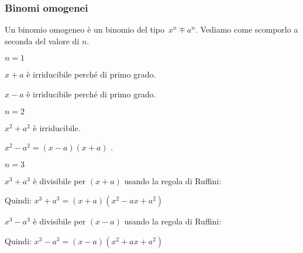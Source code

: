 

\subsubsection{Binomi omogenei}
\label{subsubsec:divpol_binomo}

Un binomio omogeneo è un binomio del tipo~$x^{n} \mp a^{n}$.
Vediamo come scomporlo a seconda del valore di $n$.

\begin{itemize*}
\item $n=1$
 \begin{itemize*}
  \item $x+a$ è irriducibile perché di primo grado.
  \item $x-a$ è irriducibile perché di primo grado.
 \end{itemize*}

 \item $n=2$
 \begin{itemize*}
  \item $x^2+a^2$ è irriducibile.
  \item $x^2-a^2=(x-a)(x+a)$ .
 \end{itemize*}

 \item $n=3$
 \begin{itemize*}
  \item 
 \begin{multicols}{2}
  $x^3+a^3$ è divisibile per $(x+a)$ usando la regola di Ruffini:
   \begin{inaccessibleblock}
    \begin{center}
    
    \end{center}
    \end{inaccessibleblock}
 \end{multicols}
   Quindi: $x^3+a^3=(x+a)(x^2-ax+a^2)$
  \item 
 \begin{multicols}{2}
  $x^3-a^3$ è divisibile per $(x-a)$ usando la regola di Ruffini:
   \begin{inaccessibleblock}
    \begin{center}
    
    \end{center}
    \end{inaccessibleblock}
 \end{multicols}
   Quindi: $x^3-a^3=(x-a)(x^2+ax+a^2)$
 \end{itemize*}


\end{itemize*}
